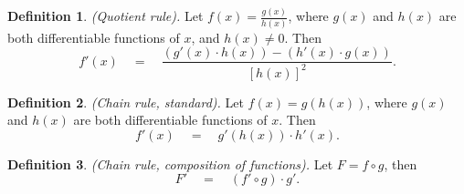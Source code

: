 \documentclass{article}
\theoremstyle{definition}
\newtheorem{definition}{Definition}
\begin{document}
\begin{definition}{\textit{(Quotient rule).}}
Let $f(x)=\frac{g(x)}{h(x)}$, where $g(x)$ and $h(x)$ are both differentiable functions of $x$, %
and $h(x)\neq0$. Then
\begin{equation*}
    f'(x)\quad=\quad \frac{(g'(x)\cdot h(x)) - (h'(x)\cdot g(x))}{[h(x)]^2}.
\end{equation*}
\end{definition}

\begin{definition}{\textit{(Chain rule, standard).}}
Let $f(x)=g(h(x))$, where $g(x)$ and $h(x)$ are both differentiable functions of $x$. Then
\begin{equation*}
    f'(x)\quad=\quad g'(h(x))\cdot h'(x).
\end{equation*}
\end{definition}

\begin{definition}{\textit{(Chain rule, composition of functions).}}
Let $F = f\circ g$, then
\begin{equation*}
    F'\quad=\quad (f'\circ g)\cdot g'.
\end{equation*}
\end{definition}
\end{document}
